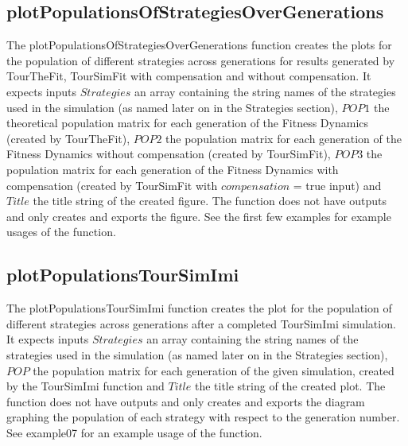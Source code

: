 \subsection{plotPopulationsOfStrategiesOverGenerations}
The plotPopulationsOfStrategiesOverGenerations function creates the plots for the population of different strategies across generations for results generated by TourTheFit, TourSimFit with compensation and without compensation. It expects inputs $Strategies$ an array containing the string names of the strategies used in the simulation (as named later on in the Strategies section), $POP1$ the theoretical population matrix for each generation of the Fitness Dynamics (created by TourTheFit), $POP2$ the population matrix for each generation of the Fitness Dynamics without compensation (created by TourSimFit), $POP3$ the population matrix for each generation of the Fitness Dynamics with compensation (created by TourSimFit with $compensation$ = true input) and $Title$ the title string of the created figure. The function does not have outputs and only creates and exports the figure. See the first few examples for example usages of the function.

\subsection{plotPopulationsTourSimImi}
The plotPopulationsTourSimImi function creates the plot for the population of different strategies across generations after a completed TourSimImi simulation. It expects inputs $Strategies$ an array containing the string names of the strategies used in the simulation (as named later on in the Strategies section), $POP$ the population matrix for each generation of the given simulation, created by the TourSimImi function and $Title$ the title string of the created plot. The function does not have outputs and only creates and exports the diagram graphing the population of each strategy with respect to the generation number. See example07 for an example usage of the function.

